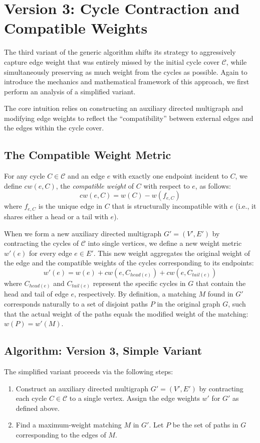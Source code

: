 \section{Version 3: Cycle Contraction and Compatible Weights} \label{sec:kps_v3}

The third variant of the generic algorithm shifts its strategy to aggressively
capture edge weight that was entirely missed by the initial cycle cover
$\mathcal{C}$, while simultaneously preserving as much weight from the cycles as
possible. Again to introduce the mechanics and mathematical framework of this
approach, we first perform an analysis of a simplified variant.

The core intuition relies on constructing an auxiliary directed multigraph and
modifying edge weights to reflect the ``compatibility'' between external edges
and the edges within the cycle cover.

\subsection{The Compatible Weight Metric}
For any cycle $C \in \mathcal{C}$ and an edge $e$ with exactly one endpoint
incident to $C$, we define $cw(e, C)$, the \textit{compatible weight} of $C$
with respect to $e$, as follows:
$$ cw(e, C) = w(C) - w(f_{e, C}) $$
where $f_{e, C}$ is the unique edge in $C$ that is structurally incompatible
with $e$ (i.e., it shares either a head or a tail with $e$).

When we form a new auxiliary directed multigraph $G' = (V', E')$ by contracting
the cycles of $\mathcal{C}$ into single vertices, we define a new weight metric
$w'(e)$ for every edge $e \in E'$. This new weight aggregates the original
weight of the edge and the compatible weights of the cycles corresponding to its
endpoints:
$$ w'(e) = w(e) + cw(e, C_{head(e)}) + cw(e, C_{tail(e)}) $$
where $C_{head(e)}$ and $C_{tail(e)}$ represent the specific cycles in $G$ that
contain the head and tail of edge $e$, respectively. By definition, a matching
$M$ found in $G'$ corresponds naturally to a set of disjoint paths $P$ in the
original graph $G$, such that the actual weight of the paths equals the modified
weight of the matching: $w(P) = w'(M)$.

\subsection{Algorithm: Version 3, Simple Variant}
The simplified variant proceeds via the following steps:
\begin{enumerate}[label=\textbf{Step 2\alph*.}, leftmargin=*]
    \item Construct an auxiliary directed multigraph $G' = (V', E')$ by
    contracting each cycle $C \in \mathcal{C}$ to a single vertex. Assign the
    edge weights $w'$ for $G'$ as defined above.
    \item Find a maximum-weight matching $M$ in $G'$. Let $P$ be the set of
    paths in $G$ corresponding to the edges of $M$.
\end{enumerate}

